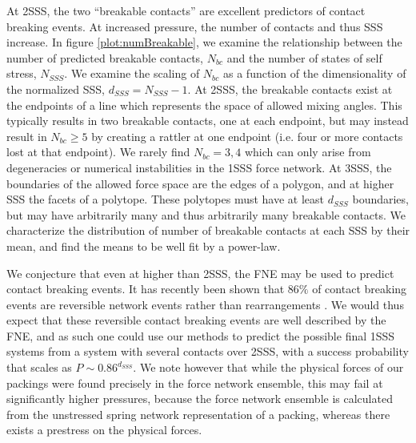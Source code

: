 At 2SSS, the two ``breakable contacts'' are excellent predictors of contact breaking events. 
At increased pressure, the number of contacts and thus SSS increase. In figure \ref{plot:numBreakable}, we examine the relationship between the number of predicted breakable contacts, $N_{bc}$ and the number of states of self stress, $N_{SSS}$. 
We examine the scaling of $N_{bc}$ as a function of the dimensionality of the normalized SSS, $d_{SSS} = N_{SSS}-1$. At 2SSS, the breakable contacts exist at the endpoints of a line which represents the space of allowed mixing angles. This typically results in two breakable contacts, one at each endpoint, but may instead result in $N_{bc}\geq 5$ by creating a rattler at one endpoint (i.e. four or more contacts lost at that endpoint). We rarely find $N_{bc}=3,4$ which can only arise from degeneracies or numerical instabilities in the 1SSS force network.
At 3SSS, the boundaries of the allowed force space are the edges of a polygon, and at higher SSS the facets of a polytope. These polytopes must have at least $d_{SSS}$ boundaries, but may have arbitrarily many and thus arbitrarily many breakable contacts.
We characterize the distribution of number of breakable contacts at each SSS by their mean, and find the means to be well fit by a power-law.

We conjecture that even at higher than 2SSS, the FNE may be used to predict contact breaking events.
It has recently been shown that $86\%$ of contact breaking events are reversible network events rather than rearrangements \cite{morse_differences_2020,tuckman_contact_2020}. We would thus expect that these reversible contact breaking events are well described by the FNE, and as such one could use our methods to predict the possible final 1SSS systems from a system with several contacts over 2SSS, with a success probability that scales as $P \sim 0.86 ^{d_{SSS}}$. We note however that while the physical forces of our packings were found precisely in the force network ensemble, this may fail at significantly higher pressures, because the force network ensemble is calculated from the unstressed spring network representation of a packing, whereas there exists a prestress on the physical forces. 




